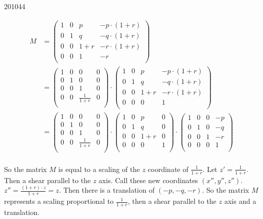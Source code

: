 \documentclass[10pt,\jkfside,a4paper]{article}
\begin{document}
\begin{enumerate}[label=(\alph*)]
\begin{examquestion}{2010}{4}{4}
\begin{enumerate}[label=(\alph*)]
\begin{enumerate}[label=(\roman*)]
\begin{equation}
\begin{split}
M &= \begin{pmatrix}
1 & 0 & p & -p\cdot(1 + r)\\
0 & 1 & q & -q\cdot(1 + r)\\
0 & 0 & 1 + r & -r\cdot(1 + r)\\
0 & 0 & 1 & -r\\
\end{pmatrix}\\
&= \begin{pmatrix}
1 & 0 & 0 & 0\\
0 & 1 & 0 & 0\\
0 & 0 & 1 & 0\\
0 & 0 & \frac{1}{1 + r} & 0\\
\end{pmatrix} \cdot
\begin{pmatrix}
1 & 0 & p 	  & -p\cdot(1 + r)\\
0 & 1 & q 	  & -q\cdot(1 + r)\\
0 & 0 & 1 + r & -r\cdot(1 + r)\\
0 & 0 & 0 	  & 1\\
\end{pmatrix}\\
&= \begin{pmatrix}
1 & 0 & 0 & 0\\
0 & 1 & 0 & 0\\
0 & 0 & 1 & 0\\
0 & 0 & \frac{1}{1 + r} & 0\\
\end{pmatrix} \cdot
\begin{pmatrix}
1 & 0 & p & 0\\
0 & 1 & q & 0\\
0 & 0 & 1 + r & 0\\
0 & 0 & 0 & 1\\
\end{pmatrix}\cdot
\begin{pmatrix}
1 & 0 & 0 	  & -p\\
0 & 1 & 0	  & -q\\
0 & 0 & 1	  & -r\\
0 & 0 & 0 	  & 1\\
\end{pmatrix}\\
\end{split}
\end{equation}

So the matrix $M$ is equal to a scaling of the $z$ coordinate of $\frac{1}{1+r}$. Let $z' = \frac{1}{1+r}$.
Then a shear parallel to the $z$ axis. Call these new coordinates $(x'', y'', z'')$. 
$z'' = \frac{(1+r)\cdot z}{1+r} = z$. Then there is a translation of $(-p, -q, -r)$.
So the matrix $M$ represents a scaling proportional to $\frac{1}{1+r}$, then a shear parallel to the $z$ axis and 
a translation.


\end{enumerate}
\end{enumerate}
\end{examquestion}
\end{enumerate}
\end{document}
